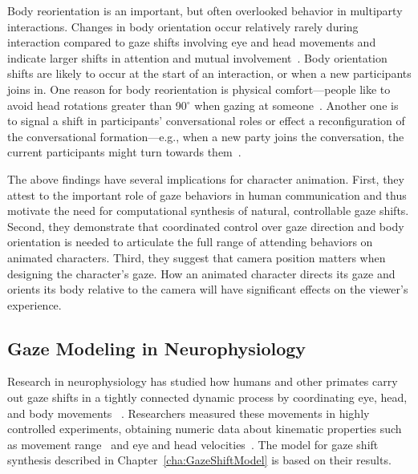 Body reorientation is an important, but often overlooked behavior in multiparty interactions. Changes in body orientation occur relatively rarely during interaction compared to gaze shifts involving eye and head movements and indicate larger shifts in attention and mutual involvement~\cite{kendon1973visible,schegloff1998bodytorque}. Body orientation shifts are likely to occur at the start of an interaction, or when a new participants joins in. One reason for body reorientation is physical comfort---people like to avoid head rotations greater than 90$^{\circ}$ when gazing at someone~\cite{kendon1973visible}. Another one is to signal a shift in participants' conversational roles or effect a reconfiguration of the conversational formation---e.g., when a new party joins the conversation, the current participants might turn towards them~\cite{kendon2010spacing}.

The above findings have several implications for character animation. First, they attest to the important role of gaze behaviors in human communication and thus motivate the need for computational synthesis of natural, controllable gaze shifts. Second, they demonstrate that coordinated control over gaze direction and body orientation is needed to articulate the full range of attending behaviors on animated characters. Third, they suggest that camera position matters when designing the character's gaze. How an animated character directs its gaze and orients its body relative to the camera will have significant effects on the viewer's experience.

\subsection{Gaze Modeling in Neurophysiology}

Research in neurophysiology has studied how humans and other primates carry out gaze shifts in a tightly connected dynamic process by coordinating eye, head, and body movements  ~\cite{zangemeister1982types,andredeshays1988eyehead1,barnes1979vor,freedman2000coordination,uemura1980eyehead,mccluskey2007monkeys}. Researchers measured these movements in highly controlled experiments, obtaining numeric data about kinematic properties such as movement range~\cite{guitton1987gaze} and eye and head velocities~\cite{guitton1987gaze,freedman2000coordination,barnes1979vor,uemura1980eyehead}. The model for gaze shift synthesis described in Chapter~\ref{cha:GazeShiftModel} is based on their results.

